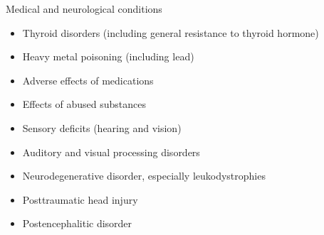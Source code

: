 \documentclass{beamer}
\begin{document}
\begin{frame}{Medical and neurological conditions}
\begin{itemize}
    \item Thyroid disorders (including general resistance to thyroid hormone)
    \item Heavy metal poisoning (including lead)
    \item Adverse effects of medications
    \item Effects of abused substances
    \item Sensory deficits (hearing and vision)
    \item Auditory and visual processing disorders
    \item Neurodegenerative disorder, especially leukodystrophies
    \item Posttraumatic head injury
    \item Postencephalitic disorder
\end{itemize}
\end{frame}
\end{document}
